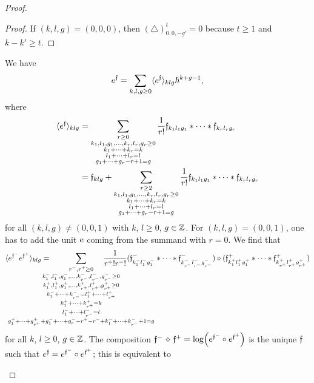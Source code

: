 \documentclass[\MainFolder/Text.tex]{subfiles}
\begin{document}
\begin{proof}
\begin{ProofList}
\begin{proof}
If $(k,l,g) = (0,0,0)$, then $(\triangle)^t_{0,0,-g'} = 0$ because $t\ge 1$ and $k-k'\ge t$.\renewcommand{\qed}{\hfill\textit{(Subclaim) }$\square$}
\end{proof}
\item We have
\[ e^{\mathfrak{f}} = \sum_{k,l,g\ge 0} \langle e^{\mathfrak{f}} \rangle_{klg} \hbar^{k+g-1}, \]
where
\begin{align}
\langle e^{\mathfrak{f}}\rangle_{klg} &= \sum_{\substack{r\ge 0 \\ k_1, l_1, g_1, \dotsc, k_r, l_r, g_r \ge 0 \\ k_1 + \dotsb + k_r = k \\ l_1 + \dotsb + l_r = l \\ g_1 + \dotsb + g_r - r + 1 = g}} \frac{1}{r!} \mathfrak{f}_{k_1 l_1 g_1}*\dotsb*\mathfrak{f}_{k_r l_r g_r} \nonumber \\
& = \mathfrak{f}_{klg} + \sum_{\substack{r\ge 2 \\ k_1, l_1, g_1, \dotsc, k_r, l_r, g_r \ge 0 \\ k_1 + \dotsb + k_r = k \\ l_1 + \dotsb + l_r = l \\ g_1 + \dotsb + g_r - r + 1 = g}} \frac{1}{r!} \mathfrak{f}_{k_1 l_1 g_1}*\dotsb*\mathfrak{f}_{k_r l_r g_r} \label{Eq:ComponentOfExpo}
\end{align}
for all $(k,l,g)\neq (0,0,1)$ with $k$, $l\ge 0$, $g\in\mathbb{Z}$. For $(k,l,g) = (0,0,1)$, one has to add the unit $\mathrm{e}$ coming from the summand with $r=0$. We find that
\[\langle e^{\MVMorF^-}e^{\MVMorF^+}\rangle_{klg} = \hspace{-2cm}\sum_{\substack{r^-, r^+ \ge 0 \\ k_{1}^-, l_1^-, g_1^-, \dotsc, k_{r^-}^-, l_{r^-}^-, g_{r^-}^- \ge 0 \\ k_{1}^+, l_1^+, g_1^+, \dotsc, k_{r^+}^+, l_{r^+}^+, g_{r^+}^+ \ge 0 \\ k_1^- + \dotsb + k^-_{r^-} = l_1^+ + \dotsb + l_{r^+}^+ \\ k_1^+ + \dotsb + k_{r^+}^+ = k \\ l_1^- + \dotsb + l_{r^-}^- = l \\ g_1^+ + \dotsb + g_{r^+}^+ + g_1^- + \dotsb + g_r^- - r^+ - r^- + k_1^- + \dotsb + k_{r^-}^- + 1 = g}}\hspace{-2.4cm}\frac{1}{r^+! r^-!} (\HTP^-_{k_1^- l_1^- g_1^-} \Star \dotsb \Star \HTP^-_{k_{r^-}^- l_{r^-}^- g_{r^-}^-})\circ (\HTP^+_{k_1^+ l_1^+ g_1^+} \Star \dotsb \Star \HTP^+_{k_{r^+}^+ l_{r^+}^+ g_{r^+}^+})\]
for all $k$, $l\ge 0$, $g\in \mathbb{Z}$. The composition $\MVMorF^-\DiamComp\MVMorF^+ = \log(e^{\MVMorF^-}\circ e^{\MVMorF^+})$ is the unique $\mathfrak{f}$ such that $e^{\mathfrak{f}} = e^{\mathfrak{f}^-}\circ e^{\mathfrak{f}^+}$; this is equivalent to 

\end{ProofList}
\end{proof}
\end{document}
